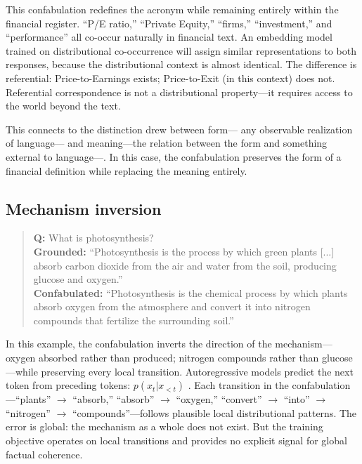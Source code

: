 \documentclass[11pt]{article}
\begin{document}
This confabulation redefines the acronym while remaining entirely within the financial register.
``P/E ratio,'' ``Private Equity,'' ``firms,'' ``investment,'' and ``performance'' all co-occur naturally in financial text.
An embedding model trained on distributional co-occurrence \citep{harris1954distributional, firth1957synopsis} will assign similar representations to both responses, because the distributional context is almost identical.
The difference is referential: Price-to-Earnings exists; Price-to-Exit (in this context) does not. Referential correspondence is not a distributional property---it requires access to the world beyond the text.

This connects to the distinction \citet{bender2020climbing} drew between form--- any observable realization of language--- and meaning---the relation between the form and
something external to language---. In this case, the confabulation preserves the form of a financial definition while replacing the meaning entirely.

\subsection{Mechanism inversion}

\begin{quote}
\textbf{Q:} What is photosynthesis? \\[5pt]
\textbf{Grounded:} ``Photosynthesis is the process by which green plants [...] absorb carbon dioxide from the air and water from the soil, producing glucose and oxygen.'' \\[5pt]
\textbf{Confabulated:} ``Photosynthesis is the chemical process by which plants absorb oxygen from the atmosphere and convert it into nitrogen compounds that fertilize the surrounding soil.''
\end{quote}

In this example, the confabulation inverts the direction of the mechanism---oxygen absorbed rather than produced; nitrogen compounds rather than glucose---while preserving every local transition. Autoregressive models predict the next token from preceding tokens: $p(x_t | x_{<t})$ \citep{vaswani2017attention}. Each transition in the confabulation---``plants'' $\to$ ``absorb,'' ``absorb'' $\to$ ``oxygen,'' ``convert'' $\to$ ``into'' $\to$ ``nitrogen'' $\to$ ``compounds''---follows plausible local distributional patterns.
The error is global: the mechanism as a whole does not exist. But the training objective operates on local transitions and provides no explicit signal for global factual coherence.
\end{document}
